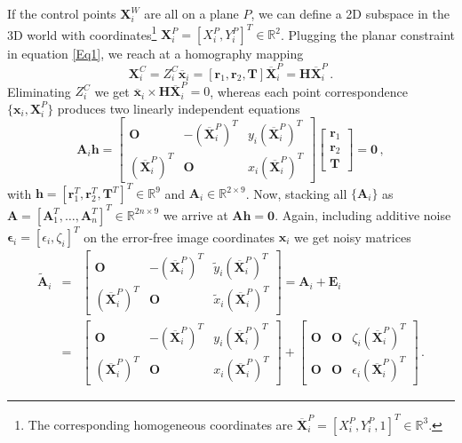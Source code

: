 \documentclass[letterpaper, 10 pt, conference]{ieeeconf}  %
\begin{document}
If the control points $\mathbf{X}_i^{W}$ are all on a plane $P$, we can define a 
2D subspace in the 3D world with 
coordinates\footnote{The corresponding homogeneous coordinates are 
$\overline{\mathbf{X}}_i^{P} = [X_i^P, Y_i^P, 1]^T \in \mathbb{R}^3$.} 
$\mathbf{X}_i^{P} = [X_i^P, Y_i^P]^T \in \mathbb{R}^2$.
Plugging the planar constraint in equation \eqref{Eq1}, we reach at a homography mapping
\begin{equation}
 \mathbf{X}_i^{C} = Z_i^C\overline{\mathbf{x}}_i = \left[\mathbf{r}_1, \mathbf{r}_2, \mathbf{T} \right]\overline{\mathbf{X}}_i^{P}
 = \mathbf{H}\overline{\mathbf{X}}_i^{P}\,.
\end{equation}
Eliminating $Z_i^C$ we get $\overline{\mathbf{x}}_i \times \mathbf{H}\overline{\mathbf{X}}_i^{P} = 0$, whereas
each point correspondence $\{\mathbf{x}_i, \mathbf{X}_i^P\}$ produces two linearly independent equations
\begin{equation}
\mathbf{A}_i\mathbf{h} = 
\begin{bmatrix}
\mathbf{O} & -(\overline{\mathbf{X}}_i^P)^T & y_i(\overline{\mathbf{X}}_i^P)^T \\
(\overline{\mathbf{X}}_i^P)^T & \mathbf{O} & x_i(\overline{\mathbf{X}}_i^P)^T 
\end{bmatrix}
\begin{bmatrix}
\mathbf{r}_1 \\
\mathbf{r}_2 \\
\mathbf{T}
\end{bmatrix}
=\mathbf{0}\, ,
\end{equation}
with $\mathbf{h}=[\mathbf{r}_1^T, \mathbf{r}_2^T, \mathbf{T}^T]^T \in \mathbb{R}^{9}$ and $\mathbf{A}_i \in \mathbb{R}^{2 \times 9}$.
Now, stacking all $\{\mathbf{A}_i\}$ as $\mathbf{A}=[\mathbf{A}_1^T, \dots, \mathbf{A}_n^T]^T \in \mathbb{R}^{2n \times 9}$ we arrive at $\mathbf{A}\mathbf{h}=\mathbf{0}$.
Again, including additive noise $\bm{\epsilon}_i = [\epsilon_i, \zeta_i]^T$ on the error-free image coordinates $\mathbf{x}_i$ we get noisy matrices
\begin{eqnarray}
\tilde{\mathbf{A}}_i & = &
\begin{bmatrix}
\mathbf{O} & -(\overline{\mathbf{X}}_i^P)^T & \tilde{y}_i(\overline{\mathbf{X}}_i^P)^T \\
(\overline{\mathbf{X}}_i^P)^T & \mathbf{O} & \tilde{x}_i(\overline{\mathbf{X}}_i^P)^T 
\end{bmatrix} = 
\mathbf{A}_i + \mathbf{E}_i \\
& = &
\begin{bmatrix}
\mathbf{O} & -(\overline{\mathbf{X}}_i^P)^T & y_i(\overline{\mathbf{X}}_i^P)^T \\
(\overline{\mathbf{X}}_i^P)^T & \mathbf{O} & x_i(\overline{\mathbf{X}}_i^P)^T 
\end{bmatrix} +
\begin{bmatrix}
\mathbf{O} & \mathbf{O} & \zeta_i(\overline{\mathbf{X}}_i^P)^T \\
\mathbf{O} & \mathbf{O} & \epsilon_i(\overline{\mathbf{X}}_i^P)^T 
\end{bmatrix}\,.
\end{eqnarray}
\end{document}
